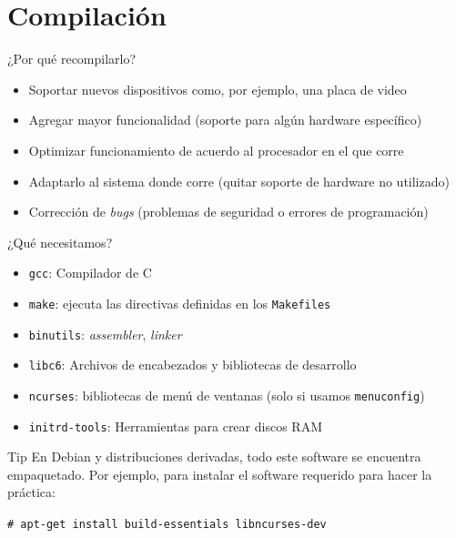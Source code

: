 \section{Compilación}
\begin{frame}{¿Por qué recompilarlo?}
\begin{itemize}
\item Soportar \alert{nuevos dispositivos} como, por ejemplo, una placa de
  video

\item Agregar \alert{mayor funcionalidad} (soporte para algún hardware
  específico)

\item Optimizar funcionamiento de acuerdo al \alert{procesador en el que
    corre}

\item \alert{Adaptarlo} al sistema donde corre (quitar soporte de hardware no utilizado)

\item \alert{Corrección} de \textit{bugs} (problemas de seguridad o errores de programación)
\end{itemize}
\end{frame}

\begin{frame}{¿Qué necesitamos?}
\begin{itemize}
\item \texttt{gcc}: Compilador de C

\item \texttt{make}: ejecuta las directivas definidas en los
  \texttt{Makefiles}
\item \texttt{binutils}: \textit{assembler}, \textit{linker}
\item \texttt{libc6}: Archivos de encabezados y bibliotecas de desarrollo
\item \texttt{ncurses}: bibliotecas de menú de ventanas (solo si usamos
  \texttt{menuconfig})
\item \texttt{initrd-tools}: Herramientas para crear discos RAM
\end{itemize}
\pause
\begin{block}{Tip}
  En Debian y distribuciones derivadas, todo este software se encuentra
  empaquetado. Por ejemplo, para instalar el software requerido para hacer
  la práctica:

  \texttt{\# apt-get install build-essentials libncurses-dev}
\end{block}
\end{frame}


